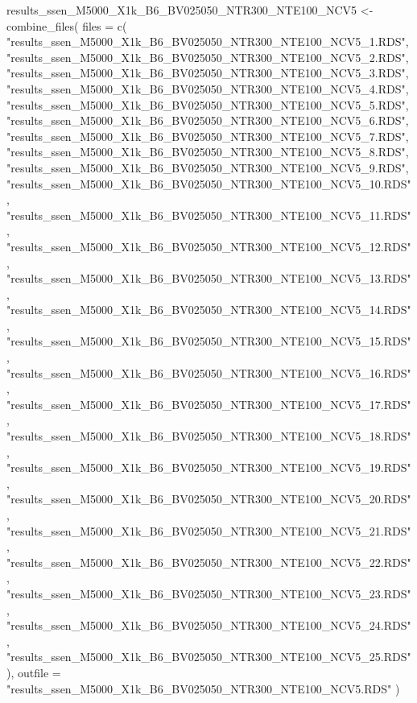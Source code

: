 \documentclass[
]{article}
\newenvironment{Shaded}{\begin{snugshade}}{\end{snugshade}}
\newcommand{\AttributeTok}[1]{\textcolor[rgb]{0.77,0.63,0.00}{#1}}
\newcommand{\FunctionTok}[1]{\textcolor[rgb]{0.00,0.00,0.00}{#1}}
\newcommand{\NormalTok}[1]{#1}
\newcommand{\OtherTok}[1]{\textcolor[rgb]{0.56,0.35,0.01}{#1}}
\newcommand{\StringTok}[1]{\textcolor[rgb]{0.31,0.60,0.02}{#1}}
\begin{document}
\begin{Shaded}
\begin{Highlighting}[]
\NormalTok{results\_ssen\_M5000\_X1k\_B6\_BV025050\_NTR300\_NTE100\_NCV5 }\OtherTok{\textless{}{-}} \FunctionTok{combine\_files}\NormalTok{(}
  \AttributeTok{files =} \FunctionTok{c}\NormalTok{(}
    \StringTok{"results\_ssen\_M5000\_X1k\_B6\_BV025050\_NTR300\_NTE100\_NCV5\_1.RDS"}\NormalTok{,}
    \StringTok{"results\_ssen\_M5000\_X1k\_B6\_BV025050\_NTR300\_NTE100\_NCV5\_2.RDS"}\NormalTok{,}
    \StringTok{"results\_ssen\_M5000\_X1k\_B6\_BV025050\_NTR300\_NTE100\_NCV5\_3.RDS"}\NormalTok{,}
    \StringTok{"results\_ssen\_M5000\_X1k\_B6\_BV025050\_NTR300\_NTE100\_NCV5\_4.RDS"}\NormalTok{,}
    \StringTok{"results\_ssen\_M5000\_X1k\_B6\_BV025050\_NTR300\_NTE100\_NCV5\_5.RDS"}\NormalTok{,}
    \StringTok{"results\_ssen\_M5000\_X1k\_B6\_BV025050\_NTR300\_NTE100\_NCV5\_6.RDS"}\NormalTok{,}
    \StringTok{"results\_ssen\_M5000\_X1k\_B6\_BV025050\_NTR300\_NTE100\_NCV5\_7.RDS"}\NormalTok{,}
    \StringTok{"results\_ssen\_M5000\_X1k\_B6\_BV025050\_NTR300\_NTE100\_NCV5\_8.RDS"}\NormalTok{,}
    \StringTok{"results\_ssen\_M5000\_X1k\_B6\_BV025050\_NTR300\_NTE100\_NCV5\_9.RDS"}\NormalTok{,}
    \StringTok{"results\_ssen\_M5000\_X1k\_B6\_BV025050\_NTR300\_NTE100\_NCV5\_10.RDS"}\NormalTok{,}
    \StringTok{"results\_ssen\_M5000\_X1k\_B6\_BV025050\_NTR300\_NTE100\_NCV5\_11.RDS"}\NormalTok{,}
    \StringTok{"results\_ssen\_M5000\_X1k\_B6\_BV025050\_NTR300\_NTE100\_NCV5\_12.RDS"}\NormalTok{,}
    \StringTok{"results\_ssen\_M5000\_X1k\_B6\_BV025050\_NTR300\_NTE100\_NCV5\_13.RDS"}\NormalTok{,}
    \StringTok{"results\_ssen\_M5000\_X1k\_B6\_BV025050\_NTR300\_NTE100\_NCV5\_14.RDS"}\NormalTok{,}
    \StringTok{"results\_ssen\_M5000\_X1k\_B6\_BV025050\_NTR300\_NTE100\_NCV5\_15.RDS"}\NormalTok{,}
    \StringTok{"results\_ssen\_M5000\_X1k\_B6\_BV025050\_NTR300\_NTE100\_NCV5\_16.RDS"}\NormalTok{,}
    \StringTok{"results\_ssen\_M5000\_X1k\_B6\_BV025050\_NTR300\_NTE100\_NCV5\_17.RDS"}\NormalTok{,}
    \StringTok{"results\_ssen\_M5000\_X1k\_B6\_BV025050\_NTR300\_NTE100\_NCV5\_18.RDS"}\NormalTok{,}
    \StringTok{"results\_ssen\_M5000\_X1k\_B6\_BV025050\_NTR300\_NTE100\_NCV5\_19.RDS"}\NormalTok{,}
    \StringTok{"results\_ssen\_M5000\_X1k\_B6\_BV025050\_NTR300\_NTE100\_NCV5\_20.RDS"}\NormalTok{,}
    \StringTok{"results\_ssen\_M5000\_X1k\_B6\_BV025050\_NTR300\_NTE100\_NCV5\_21.RDS"}\NormalTok{,}
    \StringTok{"results\_ssen\_M5000\_X1k\_B6\_BV025050\_NTR300\_NTE100\_NCV5\_22.RDS"}\NormalTok{,}
    \StringTok{"results\_ssen\_M5000\_X1k\_B6\_BV025050\_NTR300\_NTE100\_NCV5\_23.RDS"}\NormalTok{,}
    \StringTok{"results\_ssen\_M5000\_X1k\_B6\_BV025050\_NTR300\_NTE100\_NCV5\_24.RDS"}\NormalTok{,}
    \StringTok{"results\_ssen\_M5000\_X1k\_B6\_BV025050\_NTR300\_NTE100\_NCV5\_25.RDS"}
\NormalTok{  ),}
  \AttributeTok{outfile =} \StringTok{"results\_ssen\_M5000\_X1k\_B6\_BV025050\_NTR300\_NTE100\_NCV5.RDS"}
\NormalTok{)}
\end{Highlighting}
\end{Shaded}
\end{document}
